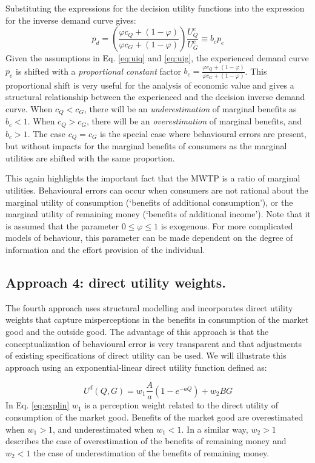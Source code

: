 \documentclass[
]{book}
\begin{document}
Substituting the expressions for the decision utility functions into the expression for the inverse demand curve gives:
\begin{equation}
p_d = \left(\frac{ \varphi c_Q + (1 - \varphi) }{\varphi c_G + (1 - \varphi) } \right) \frac{U^e_Q }{U^e_G}\equiv b_c p_e 
\end{equation}
Given the assumptions in Eq. \eqref{eq:uiq} and \eqref{eq:uig}, the experienced demand curve \(p_e\) is shifted with a \emph{proportional constant} factor \(b_c = \frac{ \varphi c_Q + (1 - \varphi) }{\varphi c_G + (1 - \varphi) }\). This proportional shift is very useful for the analysis of economic value and gives a structural relationship between the experienced and the decision inverse demand curve. When \(c_Q<c_G\), there will be an \emph{underestimation} of marginal benefits as \(b_c<1\). When \(c_Q>c_G\), there will be an \emph{overestimation} of marginal benefits, and \(b_c>1\). The case \(c_Q=c_G\) is the special case where behavioural errors are present, but without impacts for the marginal benefits of consumers as the marginal utilities are shifted with the same proportion.

This again highlights the important fact that the MWTP is a ratio of marginal utilities. Behavioural errors can occur when consumers are not rational about the marginal utility of consumption (`benefits of additional consumption'), or the marginal utility of remaining money (`benefits of additional income'). Note that it is assumed that the parameter \(0 \leq \varphi \leq 1\) is exogenous. For more complicated models of behaviour, this parameter can be made dependent on the degree of information and the effort provision of the individual.

\hypertarget{approach4}{%
\subsection{Approach 4: direct utility weights.}\label{approach4}}

The fourth approach uses structural modelling and incorporates direct utility weights that capture misperceptions in the benefits in consumption of the market good and the outside good. The advantage of this approach is that the conceptualization of behavioural error is very transparent and that adjustments of existing specifications of direct utility can be used. We will illustrate this approach using an exponential-linear direct utility function defined as:

\begin{equation}
U^d (Q,G) = w_1 \frac{A}{a}\left(1 - e^{-aQ}\right) + w_2 BG
\label{eq:explin}
\end{equation}
In Eq. \eqref{eq:explin} \(w_1\) is a perception weight related to the direct utility of consumption of the market good. Benefits of the market good are overestimated when \(w_1>1\), and underestimated when \(w_1<1\). In a similar way, \(w_2>1\) describes the case of overestimation of the benefits of remaining money and \(w_2<1\) the case of underestimation of the benefits of remaining money.
\end{document}
